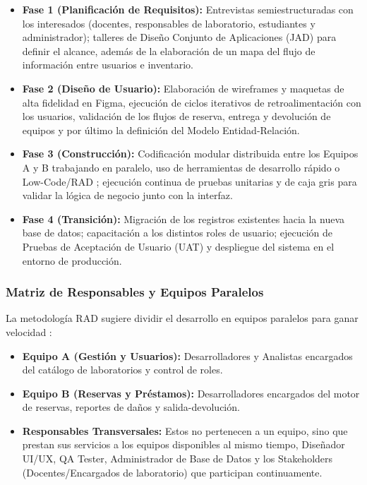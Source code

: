 \documentclass[pdflatex,sn-mathphys-num]{sn-jnl}%
\theoremstyle{thmstyleone}%
\theoremstyle{thmstyletwo}%
\theoremstyle{thmstylethree}%
\begin{document}
 \begin{itemize}
 	\item \textbf{Fase 1 (Planificación de Requisitos):} Entrevistas semiestructuradas con los interesados (docentes, responsables de laboratorio, estudiantes y administrador); talleres de Diseño Conjunto de Aplicaciones (JAD) para definir el alcance, además de la elaboración de un mapa del flujo de información entre usuarios e inventario.
 	
 	\item \textbf{Fase 2 (Diseño de Usuario):} Elaboración de wireframes y maquetas de alta fidelidad en Figma, ejecución de ciclos iterativos de retroalimentación con los usuarios, validación de los flujos de reserva, entrega y devolución de equipos y por último la definición del Modelo Entidad-Relación.
 	
 	\item \textbf{Fase 3 (Construcción):} Codificación modular distribuida entre los Equipos A y B trabajando en paralelo, uso de herramientas de desarrollo rápido o Low-Code/RAD \cite{radvilaite_integrating_2025}; ejecución continua de pruebas unitarias y de caja gris para validar la lógica de negocio junto con la interfaz.
 	
 	\item \textbf{Fase 4 (Transición):} Migración de los registros existentes hacia la nueva base de datos; capacitación a los distintos roles de usuario; ejecución de Pruebas de Aceptación de Usuario (UAT) y despliegue del sistema en el entorno de producción.
 \end{itemize}
 
 \subsubsection{Matriz de Responsables y Equipos Paralelos}
 La metodología RAD sugiere dividir el desarrollo en equipos paralelos para ganar velocidad \cite{purnamasari_rapid_2026}:
 \begin{itemize}
 	\item \textbf{Equipo A (Gestión y Usuarios):} Desarrolladores y Analistas encargados del catálogo de laboratorios y control de roles.
 	\item \textbf{Equipo B (Reservas y Préstamos):} Desarrolladores encargados del motor de reservas, reportes de daños y salida-devolución.
 	\item \textbf{Responsables Transversales:} Estos no pertenecen a un equipo, sino que prestan sus servicios a los equipos disponibles al mismo tiempo, Diseñador UI/UX, QA Tester, Administrador de Base de Datos y los Stakeholders (Docentes/Encargados de laboratorio) que participan continuamente.
 \end{itemize}
\end{document}
